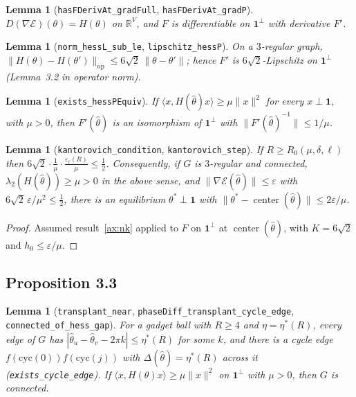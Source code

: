 \documentclass[11pt]{amsart}
\newcommand{\leanname}[1]{\texttt{\textcolor{black!75}{#1}}}
\newcommand{\E}{\mathcal{E}}
\newcommand{\R}{\mathbb{R}}
\newcommand{\one}{\mathbf{1}}
\theoremstyle{plain}
\newtheorem{lemma}[theorem]{Lemma}
\theoremstyle{definition}
\theoremstyle{remark}
\begin{document}
\begin{lemma}[\leanname{hasFDerivAt\_gradFull}, \leanname{hasFDerivAt\_gradP}]
$D(\nabla\E)(\theta)=H(\theta)$ on $\R^V$, and $F$ is differentiable on $\one^\perp$ with
derivative $F'$.
\end{lemma}

\begin{lemma}[\leanname{norm\_hessL\_sub\_le}, \leanname{lipschitz\_hessP}]
On a $3$-regular graph, $\|H(\theta)-H(\theta')\|_{\mathrm{op}}\le6\sqrt2\,\|\theta-\theta'\|$;
hence $F'$ is $6\sqrt2$-Lipschitz on $\one^\perp$ (Lemma~3.2 in operator norm).
\end{lemma}

\begin{lemma}[\leanname{exists\_hessPEquiv}]
If $\langle x,H(\hat\theta)x\rangle\ge\mu\|x\|^2$ for every $x\perp\one$, with $\mu>0$, then
$F'(\hat\theta)$ is an isomorphism of $\one^\perp$ with $\|F'(\hat\theta)^{-1}\|\le1/\mu$.
\end{lemma}

\begin{lemma}[\leanname{kantorovich\_condition}, \leanname{kantorovich\_step}]
If $R\ge R_0(\mu,\delta,\ell)$ then $6\sqrt2\cdot\frac1\mu\cdot\frac{\varepsilon_\ell(R)}\mu\le\frac12$.
Consequently, if $G$ is $3$-regular and connected, $\lambda_2(H(\hat\theta))\ge\mu>0$ in the above
sense, and $\|\nabla\E(\hat\theta)\|\le\varepsilon$ with $6\sqrt2\,\varepsilon/\mu^2\le\frac12$, there is
an equilibrium $\theta^*\perp\one$ with $\|\theta^*-\operatorname{center}(\hat\theta)\|\le2\varepsilon/\mu$.
\end{lemma}
\begin{proof}
Assumed result~\ref{ax:nk} applied to $F$ on $\one^\perp$ at $\operatorname{center}(\hat\theta)$, with
$K=6\sqrt2$ and $h_0\le\varepsilon/\mu$.
\end{proof}

\subsection{Proposition 3.3}

\begin{lemma}[\leanname{transplant\_near}, \leanname{phaseDiff\_transplant\_cycle\_edge}, \leanname{connected\_of\_hess\_gap}]
For a gadget ball with $R\ge4$ and $\eta=\eta^*(R)$, every edge of $G$ has
$|\hat\theta_u-\hat\theta_v-2\pi k|\le\eta^*(R)$ for some $k$, and there is a cycle edge
$f(\mathrm{cyc}(0))f(\mathrm{cyc}(j))$ with $\Delta(\hat\theta)=\eta^*(R)$ across it
(\leanname{exists\_cycle\_edge}). If $\langle x,H(\theta)x\rangle\ge\mu\|x\|^2$ on $\one^\perp$
with $\mu>0$, then $G$ is connected.
\end{lemma}
\end{document}
